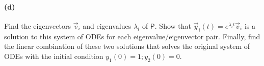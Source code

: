 \documentclass{article}
\begin{document}
\paragraph{(d)}
Find the eigenvectors $\vec{v}_{i}$ and eigenvalues $\lambda_{i}$ of $\mathsf{P}$.  Show that $\vec{y}_{i}(t) = e^{\lambda_{i}t}\vec{v}_{i}$ is a solution to this system of ODEs
for each eigenvalue/eigenvector pair.
Finally, find the linear combination of these two solutions that solves the original system of ODEs with the initial condition 
$y_{1}(0) = 1; y_{2}(0)=0$.\\
\end{document}
